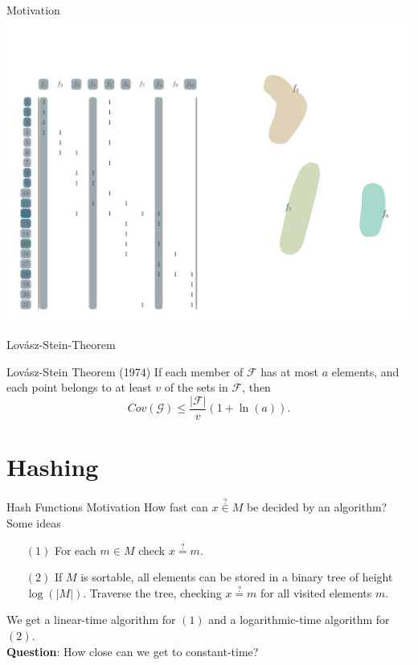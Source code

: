 \documentclass[10pt]{beamer}
\begin{document}
\begin{frame}[fragile]{Motivation}
    \vspace*{-3em}\hspace*{-2em}\includegraphics[width=1.15\textwidth]{Images/LSAExample/12}
\end{frame}



\begin{frame}[fragile]{Lovász-Stein-Theorem}
    \begin{block}{Lovász-Stein Theorem (1974)}
        If each member of $ \mathcal{F} $ has at most $ a $ elements,
        and each point belongs to at least $ v $ of the sets in $ \mathcal{F} $, then
        \[
            Cov(\mathcal{G}) \leq \frac{|\mathcal{F}|}{v}(1 + \ln(a)).
        \]
    \end{block}
\end{frame}

\section{Hashing}

\begin{frame}[fragile]{Hash Functions Motivation}
    How fast can $ x \stackrel{?}{\in} M $ be decided by an algorithm? \pause
    \\
    \vspace{1em}
    Some ideas
    \begin{itemize}
        \item[$ (1) $] For each $ m \in M $ check $ x \stackrel{?}{=} m $.\pause
        \item[$ (2) $] If $ M $ is sortable, all elements can be stored in a binary tree of height $ \log (|M|)$.
        Traverse the tree, checking $ x \stackrel{?}{=} m $ for all visited elements $ m $.\pause
    \end{itemize}
    We get a linear-time algorithm for $ (1) $ and a logarithmic-time algorithm for $ (2) $.\pause
    \\
    \vfill
    \textbf{Question}: How close can we get to constant-time?
\end{frame}
\end{document}

